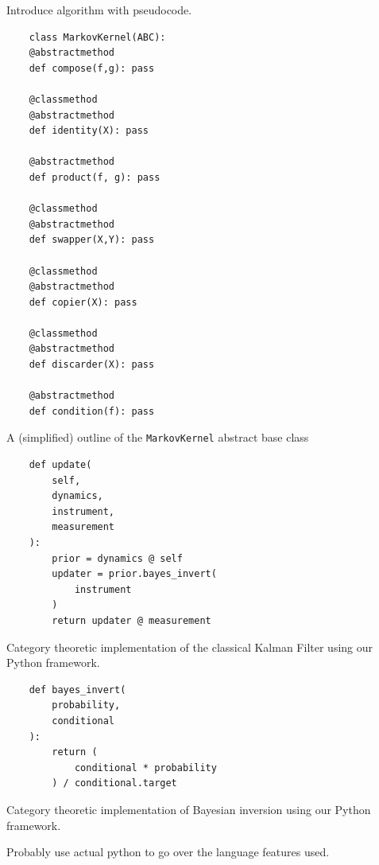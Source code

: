 \documentclass[letterpaper, 10 pt, conference]{ieeeconf}  %
\begin{document}
Introduce algorithm with pseudocode.

\begin{listing}
\begin{verbatim}
    class MarkovKernel(ABC):
	@abstractmethod
	def compose(f,g): pass

	@classmethod
	@abstractmethod
	def identity(X): pass

	@abstractmethod
	def product(f, g): pass

	@classmethod
	@abstractmethod
	def swapper(X,Y): pass

	@classmethod
	@abstractmethod
	def copier(X): pass

	@classmethod
	@abstractmethod
	def discarder(X): pass

	@abstractmethod
	def condition(f): pass
\end{verbatim}
    \caption{A (simplified) outline of the \texttt{MarkovKernel} abstract base class}
\label{listing:1}
\end{listing}

\begin{listing}
\begin{verbatim}
    def update(
        self, 
        dynamics, 
        instrument, 
        measurement
    ):
        prior = dynamics @ self
        updater = prior.bayes_invert(
            instrument
        )
        return updater @ measurement
\end{verbatim}
\caption{Category theoretic implementation of the classical Kalman Filter using our Python framework.}
\label{listing:1}
\end{listing}


\begin{listing}
\begin{verbatim}
    def bayes_invert(
        probability, 
        conditional
    ):
        return (
            conditional * probability
        ) / conditional.target
\end{verbatim}
\caption{Category theoretic implementation of Bayesian inversion using our Python framework.}
\label{listing:1}
\end{listing}

Probably use actual python to go over the language features used.
\end{document}
